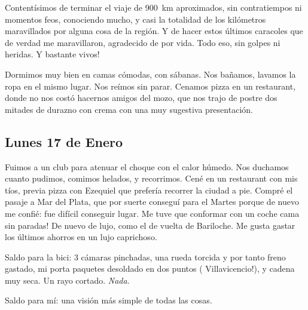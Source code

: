Content\'isimos de terminar el viaje de 900~km aproximados, sin contratiempos ni
momentos feos, conociendo mucho, y casi la totalidad de los kil\'ometros
maravillados por alguna cosa de la regi\'on. Y de hacer estos \'ultimos
caracoles que de verdad me maravillaron, agradecido de por vida. Todo eso, sin
golpes ni heridas. \textexclamdown Y bastante vivos!

Dormimos muy bien en camas c\'omodas, con s\'abanas. Nos ba\~namos, lavamos la
ropa en el mismo lugar. Nos re\'imos sin parar. Cenamos pizza en un restaurant,
donde no nos cost\'o hacernos amigos del mozo, que nos trajo de postre dos
mitades de durazno con crema con una muy sugestiva presentaci\'on.\\

\subsection*{Lunes 17 de Enero}

Fuimos a un club para atenuar el choque con el calor h\'umedo. Nos duchamos
cuanto pudimos, comimos helados, y recorrimos. Cen\'e en un restaurant con mis
t\'ios, previa pizza con Ezequiel que prefer\'ia recorrer la ciudad a pie.
Compr\'e el pasaje a Mar del Plata, que por suerte consegu\'i para el Martes
porque de nuevo me confi\'e: fue dif\'icil conseguir lugar. \textexclamdown Me
tuve que conformar con un coche cama sin paradas! De nuevo de lujo, como el de
vuelta de Bariloche. Me gusta gastar los \'ultimos ahorros en un lujo
caprichoso.

Saldo para la bici: 3 c\'amaras pinchadas, una rueda torcida y por tanto freno
gastado, mi porta paquetes desoldado en dos puntos (\textexclamdown
Villavicencio!), y cadena muy seca. Un rayo cortado. \emph{Nada}.

Saldo para m\'i: una visi\'on m\'as simple de todas las cosas.

\newpage
\thispagestyle{empty}